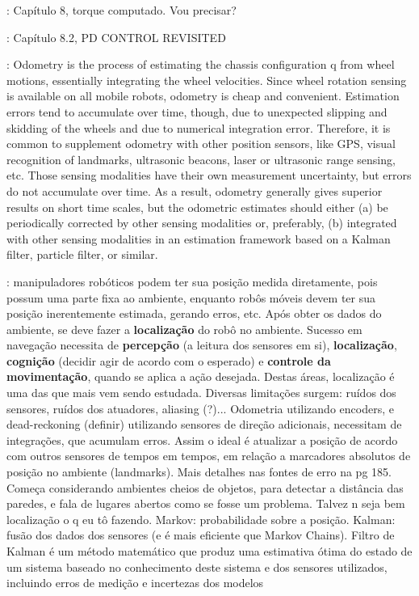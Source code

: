 \cite{siciliano2016springer}: Capítulo 8, torque computado. Vou precisar?

\cite{spong2005robot}: Capítulo 8.2, PD CONTROL REVISITED

\cite{lynch2017modern}: Odometry is the process of estimating the chassis configuration q from wheel motions, essentially integrating the wheel velocities. Since wheel rotation sensing is available on all mobile robots, odometry is cheap and convenient. Estimation errors tend to accumulate over time, though, due to unexpected slipping and skidding of the wheels and due to numerical integration error. Therefore, it is common to supplement odometry with other position sensors, like GPS, visual recognition of landmarks, ultrasonic beacons, laser or ultrasonic range sensing, etc. Those sensing modalities have their own measurement uncertainty, but errors do not accumulate over time. As a result, odometry generally gives superior results on short time scales, but the odometric estimates should either (a) be periodically corrected by other sensing modalities or, preferably, (b) integrated with other sensing modalities in an estimation framework based on a Kalman filter, particle filter, or similar.

\cite{siegwart2011introduction}: manipuladores robóticos podem ter sua posição medida diretamente, pois possum uma parte fixa ao ambiente, enquanto robôs móveis devem ter sua posição inerentemente estimada, gerando erros, etc. Após obter os dados do ambiente, se deve fazer a \textbf{localização} do robô no ambiente. Sucesso em navegação necessita de \textbf{percepção} (a leitura dos sensores em si), \textbf{localização}, \textbf{cognição} (decidir agir de acordo com o esperado) e \textbf{controle da movimentação}, quando se aplica a ação desejada. Destas áreas, localização é uma das que mais vem sendo estudada. Diversas limitações surgem: ruídos dos sensores, ruídos dos atuadores, aliasing (?)... Odometria utilizando encoders, e dead-reckoning (definir) utilizando sensores de direção adicionais, necessitam de integrações, que acumulam erros. Assim o ideal é atualizar a posição de acordo com outros sensores de tempos em tempos, em relação a marcadores absolutos de posição no ambiente (landmarks). Mais detalhes nas fontes de erro na pg 185. Começa considerando ambientes cheios de objetos, para detectar a distância das paredes, e fala de lugares abertos como se fosse um problema. Talvez n seja bem localização o q eu tô fazendo. Markov: probabilidade sobre a posição. Kalman: fusão dos dados dos sensores (e é mais eficiente que Markov Chains). Filtro de Kalman é um método matemático que produz uma estimativa ótima do estado de um sistema baseado no conhecimento deste sistema e dos sensores utilizados, incluindo erros de medição e incertezas dos modelos

